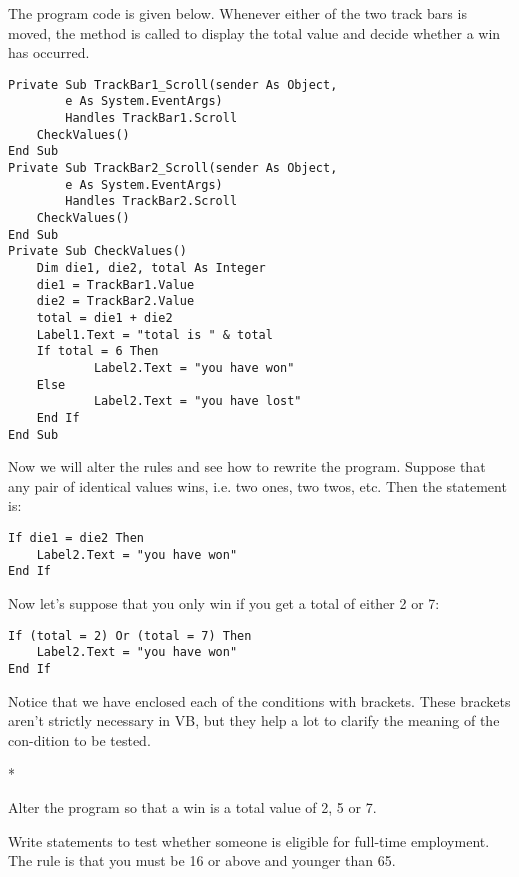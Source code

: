 		The program code is given below. Whenever either of the two track bars is moved, the method is called to display the total value and decide whether a win has occurred.
		\begin{lstlisting}
Private Sub TrackBar1_Scroll(sender As Object,
		e As System.EventArgs)
		Handles TrackBar1.Scroll
	CheckValues()
End Sub
Private Sub TrackBar2_Scroll(sender As Object,
		e As System.EventArgs)
		Handles TrackBar2.Scroll
	CheckValues()
End Sub
Private Sub CheckValues()
	Dim die1, die2, total As Integer
	die1 = TrackBar1.Value
	die2 = TrackBar2.Value
	total = die1 + die2
	Label1.Text = "total is " & total
	If total = 6 Then
			Label2.Text = "you have won"
	Else
			Label2.Text = "you have lost"
	End If
End Sub
		\end{lstlisting}
		Now we will alter the rules and see how to rewrite the program. Suppose that any pair of identical values wins, i.e. two ones, two twos, etc. Then the  statement is:
		\begin{lstlisting}
If die1 = die2 Then
	Label2.Text = "you have won"
End If
		\end{lstlisting}
		Now let's suppose that you only win if you get a total of either 2 or 7:
		\begin{lstlisting}
If (total = 2) Or (total = 7) Then
	Label2.Text = "you have won"
End If
		\end{lstlisting}
		Notice that we have enclosed each of the conditions with brackets. These brackets aren't strictly necessary in VB, but they help a lot to clarify the meaning of the con-dition to be tested.


		\begin{stqb}*
			\begin{STQ}
				\item	Alter the program so that a win is a total value of 2, 5 or 7.
				\item Write  statements to test whether someone is eligible for full-time employment. The rule is that you must be 16 or above and younger than 65.
			\end{STQ}
		\end{stqb}



